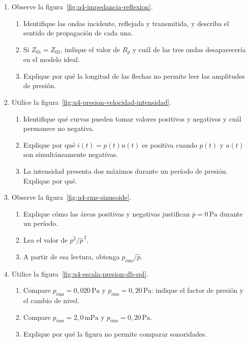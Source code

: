 \begin{enumerate}[label=\textbf{R\arabic*.},leftmargin=*]
    \item Observe la figura~\ref{fig:u4-impedancia-reflexion}.
    \begin{enumerate}[label=\alph*)]
        \item Identifique las ondas incidente, reflejada y transmitida, y
        describa el sentido de propagación de cada una.
        \item Si \(Z_{01}=Z_{02}\), indique el valor de \(R_p\) y cuál de las
        tres ondas desaparecería en el modelo ideal.
        \item Explique por qué la longitud de las flechas no permite leer las
        amplitudes de presión.
    \end{enumerate}

    \item Utilice la figura~\ref{fig:u4-presion-velocidad-intensidad}.
    \begin{enumerate}[label=\alph*)]
        \item Identifique qué curvas pueden tomar valores positivos y
        negativos y cuál permanece no negativa.
        \item Explique por qué \(i(t)=p(t)u(t)\) es positiva cuando \(p(t)\) y
        \(u(t)\) son simultáneamente negativas.
        \item La intensidad presenta dos máximos durante un período de
        presión. Explique por qué.
    \end{enumerate}

    \item Observe la figura~\ref{fig:u4-rms-sinusoide}.
    \begin{enumerate}[label=\alph*)]
        \item Explique cómo las áreas positivas y negativas justifican
        \(\overline p=0\,\text{Pa}\) durante un período.
        \item Lea el valor de
        \(\overline{p^2}/\hat p^{\,2}\).
        \item A partir de esa lectura, obtenga
        \(p_\mathrm{rms}/\hat p\).
    \end{enumerate}

    \item Utilice la figura~\ref{fig:u4-escala-presion-db-spl}.
    \begin{enumerate}[label=\alph*)]
        \item Compare \(p_\mathrm{rms}=0{,}020\,\text{Pa}\) y
        \(p_\mathrm{rms}=0{,}20\,\text{Pa}\): indique el factor de presión y
        el cambio de nivel.
        \item Compare \(p_\mathrm{rms}=2{,}0\,\text{mPa}\) y
        \(p_\mathrm{rms}=0{,}20\,\text{Pa}\).
        \item Explique por qué la figura no permite comparar sonoridades.
    \end{enumerate}


\end{enumerate}
